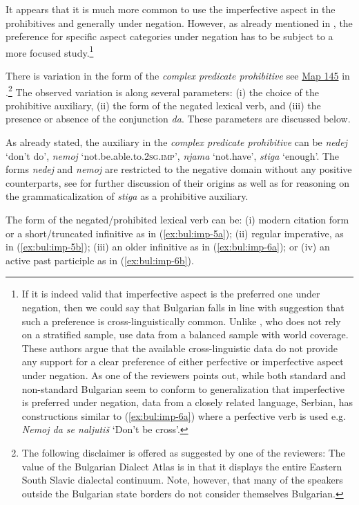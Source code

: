\documentclass[output=paper,colorlinks=true, citecolor=brown]{langscibook}
\begin{document}
It appears that it is much more common to use the imperfective aspect in the prohibitives and generally under negation. However, as already mentioned in , the preference for specific aspect categories under negation has to be subject to a more focused study.\footnote{If it is indeed valid that imperfective aspect is the preferred one under negation, then we could say that Bulgarian falls in line with  suggestion that such a preference is cross-linguistically common. Unlike \citet{Schmidt1980}, who does not rely on a stratified sample, \citet{MiestamoAuwera2011} use data from a balanced sample with world coverage. These authors argue that the available cross-linguistic data do not provide any support for a clear preference of either perfective or imperfective aspect under negation. As one of the reviewers points out, while both standard and non-standard Bulgarian seem to conform to generalization that imperfective is preferred under negation, data from a closely related language, Serbian, has constructions similar to (\ref{ex:bul:imp-6a}) where a perfective verb is used e.g. \textit{Nemoj da se naljutiš} `Don't be cross'.}

There is variation in the form of the \textit{complex predicate prohibitive} see \href{https://ibl.bas.bg/lib/bda4/#page/171/mode/1up}{Map 145} in \citet{Map145}.\footnote{The following disclaimer is offered as suggested by one of the reviewers: The value of the Bulgarian Dialect Atlas is in that it displays the entire Eastern South Slavic dialectal continuum. Note, however, that many of the speakers outside the Bulgarian state borders do not consider themselves Bulgarian.} The observed variation is along several parameters: (i) the choice of the prohibitive auxiliary, (ii) the form of the negated lexical verb, and (iii) the presence or absence of the conjunction \textit{da}. These parameters are discussed below.%

As already stated, the auxiliary in the \textit{complex predicate prohibitive} can be \textit{nedej} `don't do', \textit{nemoj} `not.be.able.to.\textsc{2sg.imp}', \textit{njama} `not.have', \textit{stiga} `enough'. The forms \textit{nedej} and \textit{nemoj} are restricted to the negative domain without any positive counterparts, see  for further discussion of their origins as well as for reasoning on the grammaticalization of \textit{stiga} as a prohibitive auxiliary. 

The form of the negated/prohibited lexical verb can be: (i)  modern citation form or a short\slash truncated infinitive as in (\ref{ex:bul:imp-5a}); (ii) regular imperative, as in (\ref{ex:bul:imp-5b}); (iii) an older infinitive as in (\ref{ex:bul:imp-6a}); or (iv) an active past participle as in (\ref{ex:bul:imp-6b}). 
\end{document}
